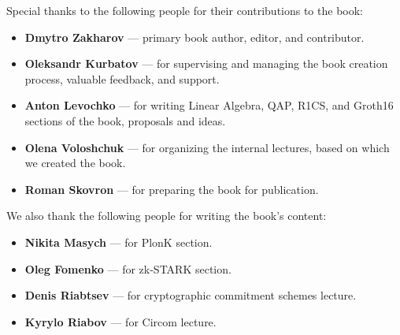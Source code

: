 \documentclass[../lecture-notes-148x210.tex]{subfiles}
\begin{document}
Special thanks to the following people for their contributions to the book:
\begin{itemize}
    \item \textbf{Dmytro Zakharov} --- primary book author, editor, and
    contributor.
    \item \textbf{Oleksandr Kurbatov} --- for supervising and managing the
    book creation process, valuable feedback, and support.
    \item \textbf{Anton Levochko} --- for writing Linear Algebra, QAP, R1CS, and
    Groth16 sections of the book, proposals and ideas.
    \item \textbf{Olena Voloshchuk} --- for organizing the internal lectures, 
    based on which we created the book.
    \item \textbf{Roman Skovron} --- for preparing the book for publication.
\end{itemize}

We also thank the following people for writing the book's content:
\begin{itemize}
    \item \textbf{Nikita Masych} --- for PlonK section.
    \item \textbf{Oleg Fomenko} --- for zk-STARK section.
    \item \textbf{Denis Riabtsev} --- for cryptographic commitment schemes lecture.
    \item \textbf{Kyrylo Riabov} --- for Circom lecture.
\end{itemize}
\end{document}

